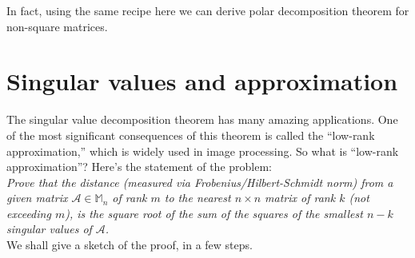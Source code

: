 \documentclass{book}
\theoremstyle{definition}
\newcommand{\A}{\mathcal{A}}
\begin{document}
In fact, using the same recipe here we can derive polar decomposition theorem for non-square matrices.






\section{Singular values and approximation}



The singular value decomposition theorem has many amazing applications. One of the most significant consequences of this theorem is called the ``low-rank approximation,'' which is widely used in image processing. So what is ``low-rank approximation''? Here's the statement of the problem:\\

\textit{Prove that the distance (measured via Frobenius/Hilbert-Schmidt norm) from a given matrix $\A \in \mathbb{M}_n$ of rank $m$ to the nearest $n\times n$ matrix of rank $k$ (not exceeding $m$), is the square root of the sum of the squares of the smallest $n-k$ singular values of $\A$. }\\

We shall give a sketch of the proof, in a few steps. \\
\end{document}
